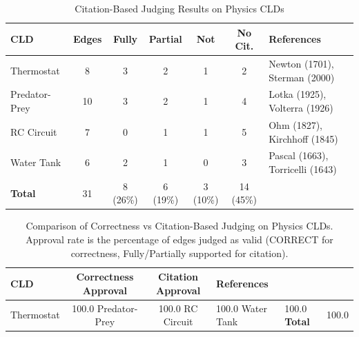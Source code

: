 \begin{table}[htbp]
\centering
\caption{Citation-Based Judging Results on Physics CLDs}
\label{tab:physics-citation-results}
\begin{tabular}{lcccccl}
\toprule
\textbf{CLD} & \textbf{Edges} & \textbf{Fully} & \textbf{Partial} & \textbf{Not} & \textbf{No Cit.} & \textbf{References} \\
\midrule
Thermostat & 8 & 3 & 2 & 1 & 2 & Newton (1701), Sterman (2000) \\
Predator-Prey & 10 & 3 & 2 & 1 & 4 & Lotka (1925), Volterra (1926) \\
RC Circuit & 7 & 0 & 1 & 1 & 5 & Ohm (1827), Kirchhoff (1845) \\
Water Tank & 6 & 2 & 1 & 0 & 3 & Pascal (1663), Torricelli (1643) \\
\midrule
\textbf{Total} & 31 & 8 (26\%) & 6 (19\%) & 3 (10\%) & 14 (45\%) & \\
\bottomrule
\end{tabular}
\end{table}


\begin{table}[htbp]
\centering
\caption{Comparison of Correctness vs Citation-Based Judging on Physics CLDs. Approval rate is the percentage of edges judged as valid (CORRECT for correctness, Fully/Partially supported for citation).}
\label{tab:physics-comparison}
\begin{tabular}{lccl}
\toprule
\textbf{CLD} & \textbf{Correctness Approval} & \textbf{Citation Approval} & \textbf{References} \\
\midrule
Thermostat & 100.0%
Predator-Prey & 100.0%
RC Circuit & 100.0%
Water Tank & 100.0%
\midrule
\textbf{Total} & 100.0%
\bottomrule
\end{tabular}
\end{table}
